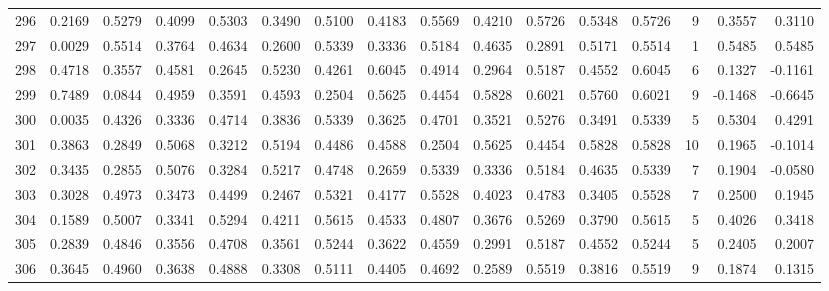 \begin{tabular}{lrrrrrrrrrrrrrrr}
296 &      0.2169 &  0.5279 &  0.4099 &  0.5303 &  0.3490 &  0.5100 &  0.4183 &  0.5569 &  0.4210 &  0.5726 &   0.5348 &     0.5726 &      9 &                    0.3557 &                     0.3110 \\
297 &      0.0029 &  0.5514 &  0.3764 &  0.4634 &  0.2600 &  0.5339 &  0.3336 &  0.5184 &  0.4635 &  0.2891 &   0.5171 &     0.5514 &      1 &                    0.5485 &                     0.5485 \\
298 &      0.4718 &  0.3557 &  0.4581 &  0.2645 &  0.5230 &  0.4261 &  0.6045 &  0.4914 &  0.2964 &  0.5187 &   0.4552 &     0.6045 &      6 &                    0.1327 &                    -0.1161 \\
299 &      0.7489 &  0.0844 &  0.4959 &  0.3591 &  0.4593 &  0.2504 &  0.5625 &  0.4454 &  0.5828 &  0.6021 &   0.5760 &     0.6021 &      9 &                   -0.1468 &                    -0.6645 \\
300 &      0.0035 &  0.4326 &  0.3336 &  0.4714 &  0.3836 &  0.5339 &  0.3625 &  0.4701 &  0.3521 &  0.5276 &   0.3491 &     0.5339 &      5 &                    0.5304 &                     0.4291 \\
301 &      0.3863 &  0.2849 &  0.5068 &  0.3212 &  0.5194 &  0.4486 &  0.4588 &  0.2504 &  0.5625 &  0.4454 &   0.5828 &     0.5828 &     10 &                    0.1965 &                    -0.1014 \\
302 &      0.3435 &  0.2855 &  0.5076 &  0.3284 &  0.5217 &  0.4748 &  0.2659 &  0.5339 &  0.3336 &  0.5184 &   0.4635 &     0.5339 &      7 &                    0.1904 &                    -0.0580 \\
303 &      0.3028 &  0.4973 &  0.3473 &  0.4499 &  0.2467 &  0.5321 &  0.4177 &  0.5528 &  0.4023 &  0.4783 &   0.3405 &     0.5528 &      7 &                    0.2500 &                     0.1945 \\
304 &      0.1589 &  0.5007 &  0.3341 &  0.5294 &  0.4211 &  0.5615 &  0.4533 &  0.4807 &  0.3676 &  0.5269 &   0.3790 &     0.5615 &      5 &                    0.4026 &                     0.3418 \\
305 &      0.2839 &  0.4846 &  0.3556 &  0.4708 &  0.3561 &  0.5244 &  0.3622 &  0.4559 &  0.2991 &  0.5187 &   0.4552 &     0.5244 &      5 &                    0.2405 &                     0.2007 \\
306 &      0.3645 &  0.4960 &  0.3638 &  0.4888 &  0.3308 &  0.5111 &  0.4405 &  0.4692 &  0.2589 &  0.5519 &   0.3816 &     0.5519 &      9 &                    0.1874 &                     0.1315 \\

\end{tabular}
